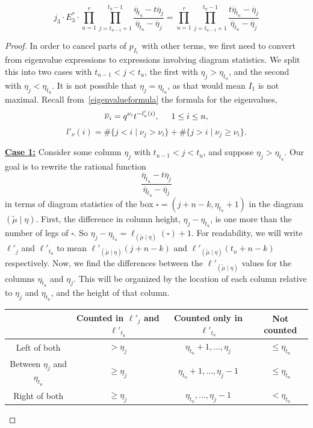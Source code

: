 \documentclass[ALCO]{cedram}
\newcommand{\mutilde}{{\widetilde{\mu}}}
\newcommand{\mutildeeta}{{(\mutilde \mid \eta)}}
\newcommand{\leg}[1]{{\ell_{#1}(\square)}}
\newcommand{\jthree}{j_3}
\newcommand{\Estarthree}{E^*_3}
\newcommand{\ltm}{\ell'_{t_u}}
\newcommand{\lj}{\ell'_j}
\begin{document}
\begin{prop}\label{prop1conversion} \begin{equation}\label{pI1conversion1} \jthree \cdot \Estarthree \cdot \prod_{u=1}^r \prod_{j=t_{u-1}+1}^{t_u-1} \frac{\overline{\eta}_{t_u}-t \overline{\eta}_j}{\overline{\eta}_{t_u}-\overline{\eta}_j} = \prod_{u=1}^r \prod_{j=t_{u-1}+1}^{t_u-1} \frac{t\overline{\eta}_{t_u}- \overline{\eta}_j}{\overline{\eta}_{t_u}-\overline{\eta}_j}  \end{equation} \end{prop} 
\begin{proof} In order to cancel parts of $p_{I_1}$ with other terms, we first need to convert from eigenvalue expressions to expressions involving diagram statistics. We split this into two cases with $t_{u-1} < j < t_u$, the first with $\eta_j>\eta_{t_u}$, and the second with $\eta_j < \eta_{t_u}$. It is not possible that $\eta_j = \eta_{t_u}$, as that would mean $I_1$ is not maximal. Recall from~\eqref{eigenvalueformula} the formula for the eigenvalues,
\[\overline{\nu}_i = q^{\nu_i} t^{-l'_\nu(i)}, \hspace*{.5cm} 1\leq i \leq n,\] 
\[l'_\nu(i) = \# \{j<i \mid \nu_j > \nu_i\} + \# \{j>i \mid \nu_j \geq \nu_i\}.\]

\underline{\textbf{Case 1:}} Consider some column $\eta_j$ with $t_{u-1} < j < t_u$, and suppose $\eta_j > \eta_{t_u}$. Our goal is to rewrite the rational function
\[ \frac{\overline{\eta}_{t_u}-t \overline{\eta}_j}{\overline{\eta}_{t_u}-\overline{\eta}_j}\]
in terms of diagram statistics of the box $\square = (j+n-k,\eta_{t_u}+1)$ in the diagram $ \mutildeeta $. First, the difference in column height, $\eta_{j}-\eta_{t_u}$, is one more than the number of legs of $\square$. So $\eta_j-\eta_{t_u} = \leg{\mutildeeta}+1$. For readability, we will write $\lj$ and  $\ltm$ to mean $\ell'_{\mutildeeta}(j+n-k)$ and $\ell'_{\mutildeeta}(t_u+n-k)$ respectively. Now, we find the differences between the $\ell'_\mutildeeta$ values for the columns $\eta_{t_u}$ and $\eta_j$. This will be organized by the location of each column relative to $\eta_j$ and $\eta_{t_u}$, and the height of that column.\\
\begin{center}\begin{tabular}{|c|c|c|c|}
     \hline
     & Counted in $\lj$ and $\ltm$ & Counted only in $\ltm$ & Not counted   \\ \hline
     Left of both& $> \eta_{j}$ &  $\eta_{t_u}+1, \dotsc, \eta_j $ & $\leq \eta_{t_u}$  \\ \hline
     Between $\eta_j$ and $\eta_{t_u}$ & $\geq \eta_j$ & $\eta_{t_u}+1, \dotsc, \eta_j-1$& $\leq \eta_{t_u}$\\ \hline 
     Right of both & $\geq \eta_j$ & $\eta_{t_u} , \dotsc, \eta_{j}-1$& $< \eta_{t_u}$ \\ \hline 
\end{tabular}
\end{center}


\end{proof}
\end{document}
